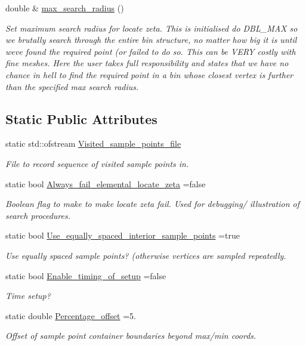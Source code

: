 \begin{DoxyCompactItemize}
double \& \hyperlink{classSamplePointContainer_ad38b50923288cd35ff5e24ada05d0c59}{max\+\_\+search\+\_\+radius} ()
\begin{DoxyCompactList}\small\item\em Set maximum search radius for locate zeta. This is initialised do D\+B\+L\+\_\+\+M\+AX so we brutally search through the entire bin structure, no matter how big it is until we\textquotesingle{}ve found the required point (or failed to do so. This can be V\+E\+RY costly with fine meshes. Here the user takes full responsibility and states that we have no chance in hell to find the required point in a bin whose closest vertex is further than the specified max search radius. \end{DoxyCompactList}\end{DoxyCompactItemize}
\subsection*{Static Public Attributes}
\begin{DoxyCompactItemize}
\item 
static std\+::ofstream \hyperlink{classSamplePointContainer_ad08a1cb658b3783bcf7d8491e90965f3}{Visited\+\_\+sample\+\_\+points\+\_\+file}
\begin{DoxyCompactList}\small\item\em File to record sequence of visited sample points in. \end{DoxyCompactList}\item 
static bool \hyperlink{classSamplePointContainer_a1098cdf602fabc6ceec41bb7ea73805f}{Always\+\_\+fail\+\_\+elemental\+\_\+locate\+\_\+zeta} =false
\begin{DoxyCompactList}\small\item\em Boolean flag to make to make locate zeta fail. Used for debugging/ illustration of search procedures. \end{DoxyCompactList}\item 
static bool \hyperlink{classSamplePointContainer_affcd582fab41aa86bfe46e1bf92fafd1}{Use\+\_\+equally\+\_\+spaced\+\_\+interior\+\_\+sample\+\_\+points} =true
\begin{DoxyCompactList}\small\item\em Use equally spaced sample points? (otherwise vertices are sampled repeatedly. \end{DoxyCompactList}\item 
static bool \hyperlink{classSamplePointContainer_a1755d4419776cc87ab27e845d03449de}{Enable\+\_\+timing\+\_\+of\+\_\+setup} =false
\begin{DoxyCompactList}\small\item\em Time setup? \end{DoxyCompactList}\item 
static double \hyperlink{classSamplePointContainer_a13035786055416a2da9ae7eec515bccd}{Percentage\+\_\+offset} =5.
\begin{DoxyCompactList}\small\item\em Offset of sample point container boundaries beyond max/min coords. \end{DoxyCompactList}\end{DoxyCompactItemize}
